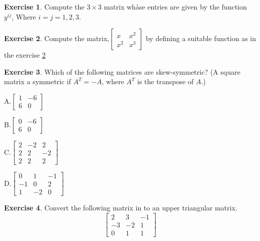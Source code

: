\documentclass[
]{book}
\theoremstyle{definition}
\theoremstyle{definition}
\theoremstyle{definition}
\newtheorem{exercise}{Exercise}[chapter]
\theoremstyle{definition}
\theoremstyle{remark}
\begin{document}
\begin{exercise}
\protect\hypertarget{exr:q3}{}\label{exr:q3}Compute the \(3\times 3\) matrix whåse entries are given by the function \(y^{ij}\), Where \(i = j = 1, 2, 3\).
\end{exercise}

\begin{exercise}
\protect\hypertarget{exr:qthree}{}\label{exr:qthree}Compute the matrix,\(\begin{bmatrix}
  x & x^2 \\x^2 & x^3
  \end{bmatrix}\)
by defining a suitable function as in the exercise \ref{exr:qthree}
\end{exercise}

\begin{exercise}
\protect\hypertarget{exr:unnamed-chunk-3}{}\label{exr:unnamed-chunk-3}Which of the following matrices are skew-symmetric?
(A square matrix a symmetric if \(A^T = -A\), where \(A^T\) is the transpose of \(A\).)

A.\(\begin{bmatrix} 1 & -6 \\ 6 & 0 \end{bmatrix}\)

B.\(\begin{bmatrix} 0 & -6 \\ 6 & 0 \end{bmatrix}\)

C.\(\begin{bmatrix} 2 & -2 & 2 \\ 2 & 2 & -2 \\ 2 & 2 & 2 \end{bmatrix}\)

D.\(\begin{bmatrix} 0 & 1 & -1 \\ -1 & 0 & 2 \\ 1 & -2 & 0\end{bmatrix}\)
\end{exercise}

\begin{exercise}
\protect\hypertarget{exr:unnamed-chunk-4}{}\label{exr:unnamed-chunk-4}Convert the following matrix in to an upper triangular matrix.
\[\begin{bmatrix} 2 & 3 & -1 \\ -3 & -2 & 1 \\  0& 1 & 1\end{bmatrix}\]
\end{exercise}
\end{document}
